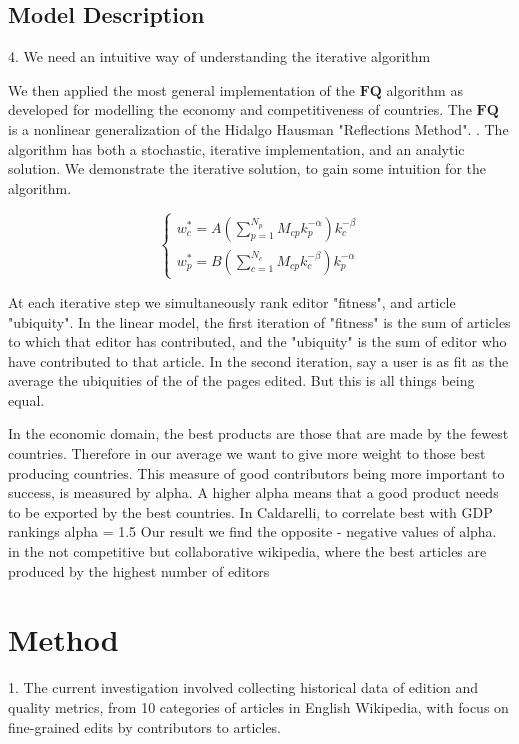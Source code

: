 \documentclass{acm_proc_article-sp}
\begin{document}
\subsection{Model Description}
4. We need an intuitive way of understanding the iterative algorithm

We then applied the most general implementation of the $\mathbf{FQ}$ algorithm as developed for modelling the economy and competitiveness of countries. The $\mathbf{FQ}$ is a nonlinear generalization of the Hidalgo Hausman "Reflections Method". \cite{Caldarelli}. The algorithm has both a stochastic, iterative implementation, and an analytic solution. We demonstrate the iterative solution, to gain some intuition for the algorithm.

\begin{equation}
\begin{cases}
 w^*_c = A(\sum^{N_p}_{p=1} M_{cp}k_p^{-\alpha})k_c^{-\beta} \\
w^*_p = B(\sum^{N_c}_{c=1} M_{cp}k_c^{-\beta})k_p^{-\alpha}
\end{cases}
\end{equation}

At each iterative step we simultaneously rank editor "fitness", and article "ubiquity". In the linear model, the first iteration of "fitness" is the sum of articles to which that editor has contributed, and the "ubiquity" is the sum of editor who have contributed to that article. In the second iteration, say a user is as fit as the average the ubiquities of the of the pages edited. But this is all things being equal.

In the economic domain, the best products are those that are made by the fewest countries. Therefore in our average we want to give more weight to those best producing countries. This measure of good contributors being more important to success, is measured by alpha. A higher alpha means that a good product needs to be exported by the best countries. In Caldarelli, to correlate best with GDP rankings alpha = 1.5 Our result we find the  opposite - negative values of alpha. in the not competitive but collaborative wikipedia, where the best articles are produced by the highest number of editors


\section{Method}

1. The current investigation involved collecting historical data of edition and quality metrics, from 10 categories of articles in English Wikipedia, with focus on fine-grained edits by contributors to articles.
\end{document}
